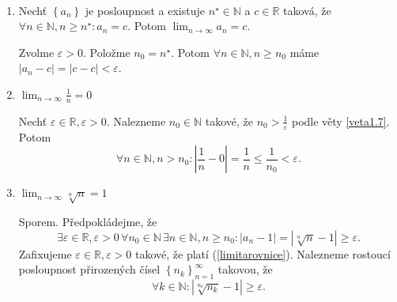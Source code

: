 \begin{priklad}
	\,
	\begin{enumerate}
		\item Nechť $\left \{ a_n \right \} $ je posloupnost a existuje $n^\star\in \mathbb N $ a $c \in \mathbb R $ taková,
		že $\forall n \in \mathbb N , n\geq n^\star:a_n = c$. Potom $\lim_{n \to \infty} a_n = c$.
		\par Zvolme $\varepsilon > 0$. Položme $n_0 = n^\star$. Potom $\forall n \in \mathbb N , n \geq n_0$ máme
		$|a_n-c|=|c-c|<\varepsilon.$
		\item $\lim_{n \to \infty} \frac{1}{n}=0$
		\par Nechť $\varepsilon \in \mathbb R , \varepsilon > 0$. Nalezneme $n_0 \in \mathbb N $ takové, že
		$n_0 > \frac{1}{\varepsilon}$ podle věty \ref{veta1.7}. Potom
		$$\forall n\in \mathbb N , n > n_0: \left | \frac{1}{n}-0\right |=\frac{1}{n}\leq \frac{1}{n_0}<\varepsilon.$$
		\item $\lim_{n \to \infty} \sqrt[n]{n}=1$
		\par Sporem. Předpokládejme, že
		\begin{equation}\label{limitarovnice}
			\exists \varepsilon \in \mathbb R , \varepsilon > 0\, \forall n_0 \in \mathbb N  \, \exists n \in \mathbb N , n \geq n_0: |a_n - 1| = |\sqrt[n]{n}-1| \geq \varepsilon.
		\end{equation}
		Zafixujeme $\varepsilon \in \mathbb R , \varepsilon > 0$ takové, že platí (\ref{limitarovnice}). Nalezneme rostoucí posloupnost
		přirozených čísel $\left \{ n_k \right \}_{n=1}^\infty $ takovou, že
		$$
		    \forall k \in \mathbb N : \left | \sqrt[n_k]{n_k}  -1\right| \geq \varepsilon.
		$$

\end{enumerate}
\end{priklad}
